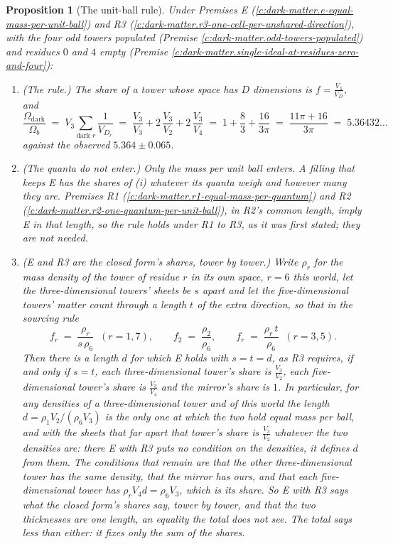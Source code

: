 \documentclass[11pt]{article}
\newtheorem{proposition}[theorem]{Proposition}
\theoremstyle{definition}
\theoremstyle{plain}
\newcommand{\changedmark}[2]{\marginpar{\raggedright\scriptsize\color{#1}#2}}
\begin{document}
\begin{proposition}[The unit-ball rule]\label{c:dark-matter.unit-ball-rule}
\changedmark{BurntOrange}{changed since the deposit}
Under Premises E (\ref{c:dark-matter.e-equal-mass-per-unit-ball}) and R3 (\ref{c:dark-matter.r3-one-cell-per-unshared-direction}), with the four odd towers populated (Premise \ref{c:dark-matter.odd-towers-populated}) and residues $0$ and $4$ empty (Premise \ref{c:dark-matter.single-ideal-at-residues-zero-and-four}):
\begin{enumerate}
\item[(i)] \emph{(The rule.)} The share of a tower whose space has $D$ dimensions is $f = \tfrac{V_{3}}{V_{D}}$, and
\[
\frac{\Omega_{\mathrm{dark}}}{\Omega_{b}} \;=\; V_{3}\sum_{\text{dark }r}\frac{1}{V_{D_{r}}}
\;=\; \frac{V_{3}}{V_{3}} + 2\,\frac{V_{3}}{V_{2}} + 2\,\frac{V_{3}}{V_{4}}
\;=\; 1 + \frac{8}{3} + \frac{16}{3\pi} \;=\; \frac{11\pi + 16}{3\pi} \;=\; 5.36432\ldots
\]
against the observed $5.364 \pm 0.065$.
\item[(ii)] \emph{(The quanta do not enter.)} Only the mass per unit ball enters. A filling that keeps E has the shares of (i) whatever its quanta weigh and however many they are. Premises R1 (\ref{c:dark-matter.r1-equal-mass-per-quantum}) and R2 (\ref{c:dark-matter.r2-one-quantum-per-unit-ball}), in R2's common length, imply E in that length, so the rule holds under R1 to R3, as it was first stated; they are not needed.
\item[(iii)] \emph{(E and R3 are the closed form's shares, tower by tower.)} Write $\rho_{r}$ for the mass density of the tower of residue $r$ in its own space, $r = 6$ this world, let the three-dimensional towers' sheets be $s$ apart and let the five-dimensional towers' matter count through a length $t$ of the extra direction, so that in the sourcing rule
\[
f_{r} \;=\; \frac{\rho_{r}}{s\,\rho_{6}} \;\; (r = 1, 7), \qquad f_{2} \;=\; \frac{\rho_{2}}{\rho_{6}}, \qquad f_{r} \;=\; \frac{\rho_{r}\,t}{\rho_{6}} \;\; (r = 3, 5) .
\]
Then there is a length $d$ for which E holds with $s = t = d$, as R3 requires, if and only if $s = t$, each three-dimensional tower's share is $\tfrac{V_{3}}{V_{2}}$, each five-dimensional tower's share is $\tfrac{V_{3}}{V_{4}}$ and the mirror's share is $1$. In particular, for any densities of a three-dimensional tower and of this world the length $d = \rho_{1}V_{2}/(\rho_{6}V_{3})$ is the only one at which the two hold equal mass per ball, and with the sheets that far apart that tower's share is $\tfrac{V_{3}}{V_{2}}$ whatever the two densities are: there E with R3 puts no condition on the densities, it defines $d$ from them. The conditions that remain are that the other three-dimensional tower has the same density, that the mirror has ours, and that each five-dimensional tower has $\rho_{r}V_{4}d = \rho_{6}V_{3}$, which is its share. So E with R3 says what the closed form's shares say, tower by tower, and that the two thicknesses are one length, an equality the total does not see. The total says less than either: it fixes only the sum of the shares.

\end{enumerate}
\end{proposition}
\end{document}

